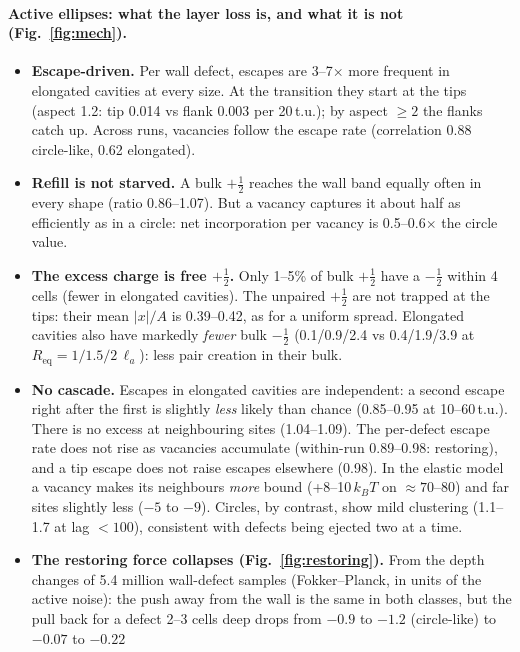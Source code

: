 \documentclass[11pt,a4paper]{article}
\newcommand{\half}{\tfrac12}
\newcommand{\la}{\ell_a}
\newcommand{\kT}{k_BT}
\begin{document}
\paragraph{Active ellipses: what the layer loss is, and what it is not (Fig.~\ref{fig:mech}).}
\begin{itemize}
  \item \textbf{Escape-driven.} Per wall defect, escapes are 3--7$\times$ more frequent in elongated cavities at every size. At the transition they start at the tips
        (aspect 1.2: tip 0.014 vs flank 0.003 per 20\,t.u.); by aspect $\ge2$ the flanks catch up. Across runs, vacancies follow the escape rate (correlation 0.88 circle-like, 0.62 elongated).
  \item \textbf{Refill is not starved.} A bulk $+\half$ reaches the wall band equally often in every shape (ratio 0.86--1.07). But a vacancy captures it about half as
        efficiently as in a circle: net incorporation per vacancy is 0.5--0.6$\times$ the circle value.
  \item \textbf{The excess charge is free $+\half$.} Only 1--5\% of bulk $+\half$ have a $-\half$ within 4 cells (fewer in elongated cavities). The unpaired $+\half$ are not trapped at
        the tips: their mean $|x|/A$ is 0.39--0.42, as for a uniform spread. Elongated cavities also have markedly \emph{fewer} bulk $-\half$ (0.1/0.9/2.4 vs 0.4/1.9/3.9 at
        $R_\mathrm{eq}=1/1.5/2\,\la$): less pair creation in their bulk.
  \item \textbf{No cascade.} Escapes in elongated cavities are independent: a second escape right after the first is slightly \emph{less} likely than chance (0.85--0.95 at
        10--60\,t.u.). There is no excess at neighbouring sites (1.04--1.09). The per-defect escape rate does not rise as vacancies accumulate (within-run 0.89--0.98: restoring),
        and a tip escape does not raise escapes elsewhere (0.98). In the elastic model a vacancy makes its neighbours \emph{more} bound (+8--10\,$\kT$ on $\approx70$--80) and
        far sites slightly less ($-5$ to $-9$). Circles, by contrast, show mild clustering (1.1--1.7 at lag $<100$), consistent with defects being ejected two at a time.
  \item \textbf{The restoring force collapses (Fig.~\ref{fig:restoring}).} From the depth changes of 5.4 million wall-defect samples (Fokker--Planck, in units of the active noise):
        the push away from the wall is the same in both classes, but the pull back for a defect 2--3 cells deep drops from $-0.9$ to $-1.2$ (circle-like) to $-0.07$ to $-0.22$

\end{itemize}
\end{document}
